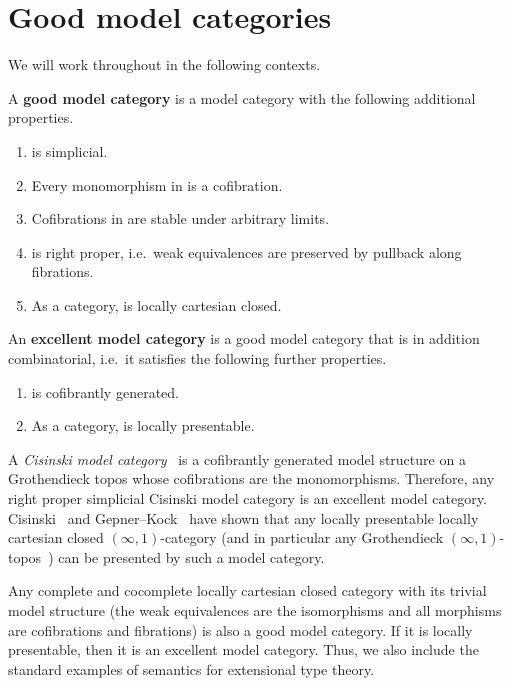 \section{Good model categories}
\label{sec:model-categ-type}

We will work throughout in the following contexts.

\begin{defn}
  A \textbf{good model category} is a model category \sM with the following additional properties.
  \begin{enumerate}
  \item \sM is simplicial.\label{item:m0}
  \item Every monomorphism in \sM is a cofibration.\label{item:m1}
  \item Cofibrations in \sM are stable under arbitrary limits.\label{item:m1a}
  \item \sM is right proper, i.e.\ weak equivalences are preserved by pullback along fibrations.\label{item:m2}
  \item As a category, \sM is locally cartesian closed.\label{item:m3}
  \end{enumerate}
  An \textbf{excellent model category} is a good model category that is in addition combinatorial, i.e.\ it satisfies the following further properties.
  \begin{enumerate}[resume]
  \item \sM is cofibrantly generated.
  \item As a category, \sM is locally presentable.
  \end{enumerate}
\end{defn}

\begin{eg}
A \emph{Cisinski model category}~\cite{cisinski:topos,cisinski:presheaves} is a cofibrantly generated model structure on a Grothendieck topos whose cofibrations are the monomorphisms.
Therefore, any right proper simplicial Cisinski model category is an excellent model category.
Cisinski~\cite{cisinski:lccc-rpcmc} and Gepner--Kock~\cite{gk:univlcc} have shown that any locally presentable locally cartesian closed $(\infty,1)$-category (and in particular any Grothendieck $(\infty,1)$-topos~\cite{lurie:higher-topoi}) can be presented by such a model category.
\end{eg}

\begin{eg}
Any complete and cocomplete locally cartesian closed category with its trivial model structure (the weak equivalences are the isomorphisms and all morphisms are cofibrations and fibrations) is also a good model category.
If it is locally presentable, then it is an excellent model category.
Thus, we also include the standard examples of semantics for extensional type theory.
\end{eg}

